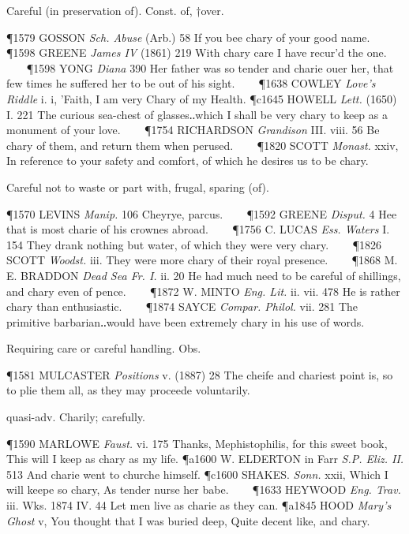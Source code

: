 \begin{description}[wide, labelwidth=!, labelindent=0pt]
\begin{myenumerate}
 Careful (in preservation of). Const. of, †over.

\P 1579 GOSSON  \textit{Sch. Abuse} (Arb.) 58 If you bee chary of your good name.    
\P 1598 GREENE  \textit{James IV} (1861) 219 With chary care I have recur'd the one.    
\P 1598 YONG  \textit{Diana} 390 Her father was so tender and charie ouer her, that few times he suffered her to be out of his sight.    
\P 1638 COWLEY  \textit{Love's Riddle} i. i, 'Faith, I am very Chary of my Health.
\P c1645 HOWELL  \textit{Lett.} (1650) I. 221 The curious sea-chest of glasses‥which I shall be very chary to keep as a monument of your love.    
\P 1754 RICHARDSON  \textit{Grandison} III. viii. 56 Be chary of them, and return them when perused.    
\P 1820 SCOTT  \textit{Monast.} xxiv, In reference to your safety and comfort, of which he desires us to be chary.

 Careful not to waste or part with, frugal, sparing (of).

\P 1570 LEVINS  \textit{Manip.} 106 Cheyrye, parcus.    
\P 1592 GREENE  \textit{Disput.} 4 Hee that is most charie of his crownes abroad.    
\P 1756 C. LUCAS  \textit{Ess. Waters} I. 154 They drank nothing but water, of which they were very chary.    
\P 1826 SCOTT  \textit{Woodst.} iii. They were more chary of their royal presence.    
\P 1868 M. E. BRADDON  \textit{Dead Sea Fr. I.} ii. 20 He had much need to be careful of shillings, and chary even of pence.    
\P 1872 W. MINTO  \textit{Eng. Lit.} ii. vii. 478 He is rather chary than enthusiastic.    
\P 1874 SAYCE  \textit{Compar. Philol.} vii. 281 The primitive barbarian‥would have been extremely chary in his use of words.

 Requiring care or careful handling. Obs.

\P 1581 MULCASTER  \textit{Positions} v. (1887) 28 The cheife and chariest point is, so to plie them all, as they may proceede voluntarily.

 quasi-adv. Charily; carefully.

\P 1590 MARLOWE  \textit{Faust.} vi. 175 Thanks, Mephistophilis, for this sweet book, This will I keep as chary as my life.
\P a1600 W. ELDERTON  in Farr \textit{S.P. Eliz. II.} 513 And charie went to churche himself.
\P c1600 SHAKES.  \textit{Sonn.} xxii, Which I will keepe so chary, As tender nurse her babe.    
\P 1633 HEYWOOD  \textit{Eng. Trav.} iii. Wks. 1874 IV. 44 Let  men live as charie as they can.
\P a1845 HOOD  \textit{Mary's Ghost} v, You thought that I was buried deep, Quite decent like, and chary.
\end{myenumerate}



\end{description}
